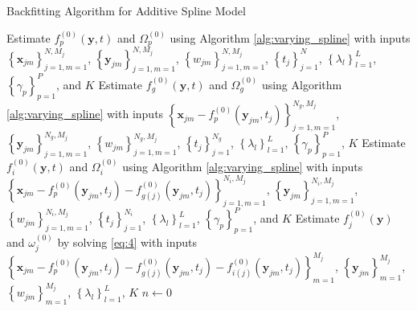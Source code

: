 \documentclass[11pt,reqno]{article}
\theoremstyle{definition}
\begin{document}
\begin{algorithm}
\footnotesize
\caption{Backfitting Algorithm for Additive Spline Model}\label{alg:backfitting}

  Estimate $f_{p}^{(0)}(\mathbf{y}, t)$ and $\Omega_{p}^{(0)}$ using Algorithm \ref{alg:varying_spline} with inputs $\left\{\mathbf{x}_{jm}\right\}_{j=1, m=1}^{N, M_j}$, $\left\{\mathbf{y}_{jm}\right\}_{j=1, m=1}^{N, M_j}$, $\left\{w_{jm}\right\}_{j=1, m=1}^{N, M_j}$, $\left\{t_{j}\right\}_{j=1}^{N}$, $\left\{\lambda_l\right\}_{l=1}^{L}$, $\left\{\gamma_p\right\}_{p=1}^{P}$, and $K$\;
   {
    Estimate $f_{g}^{(0)}(\mathbf{y}, t)$ and $\Omega_{g}^{(0)}$ using Algorithm \ref{alg:varying_spline} with inputs $\left\{\mathbf{x}_{jm} - f_{p}^{(0)}(\mathbf{y}_{jm}, t_j)\right\}_{j=1, m=1}^{N_g, M_j}$, $\left\{\mathbf{y}_{jm}\right\}_{j=1, m=1}^{N_g, M_j}$, $\left\{w_{jm}\right\}_{j=1, m=1}^{N_g, M_j}$, $\left\{t_j\right\}_{j=1}^{N_g}$, $\left\{\lambda_l\right\}_{l=1}^{L}$, $\left\{\gamma_p\right\}_{p=1}^{P}$, $K$\;
  }
   {
    Estimate $f_{i}^{(0)}(\mathbf{y}, t)$ and $\Omega_{i}^{(0)}$ using Algorithm \ref{alg:varying_spline} with inputs $\left\{\mathbf{x}_{jm} - f_{p}^{(0)}(\mathbf{y}_{jm}, t_j) - f_{g(j)}^{(0)}(\mathbf{y}_{jm}, t_j)\right\}_{j=1, m=1}^{N_i, M_j}$, $\left\{\mathbf{y}_{jm}\right\}_{j=1, m=1}^{N_i, M_j}$, $\left\{w_{jm}\right\}_{j=1, m=1}^{N_i, M_j}$, $\left\{t_j\right\}_{j=1}^{N_i}$, $\left\{\lambda_l\right\}_{l=1}^{L}$, $\left\{\gamma_p\right\}_{p=1}^{P}$, and $K$\;
  }
   {
    Estimate $f_{j}^{(0)}(\mathbf{y})$ and $\omega_{j}^{(0)}$ by solving \ref{eq:4} with inputs $\left\{\mathbf{x}_{jm} - f_{p}^{(0)}(\mathbf{y}_{jm}, t_j) - f_{g(j)}^{(0)}(\mathbf{y}_{jm}, t_j) - f_{i(j)}^{(0)}(\mathbf{y}_{jm}, t_j)\right\}_{m=1}^{M_j}$, $\left\{\mathbf{y}_{jm}\right\}_{m=1}^{M_j}$, $\left\{w_{jm}\right\}_{m = 1}^{M_j}$, $\left\{\lambda_l\right\}_{l=1}^{L}$, $K$\;
  }
  $n \gets 0$\;
   {
}
\end{algorithm}
\end{document}
